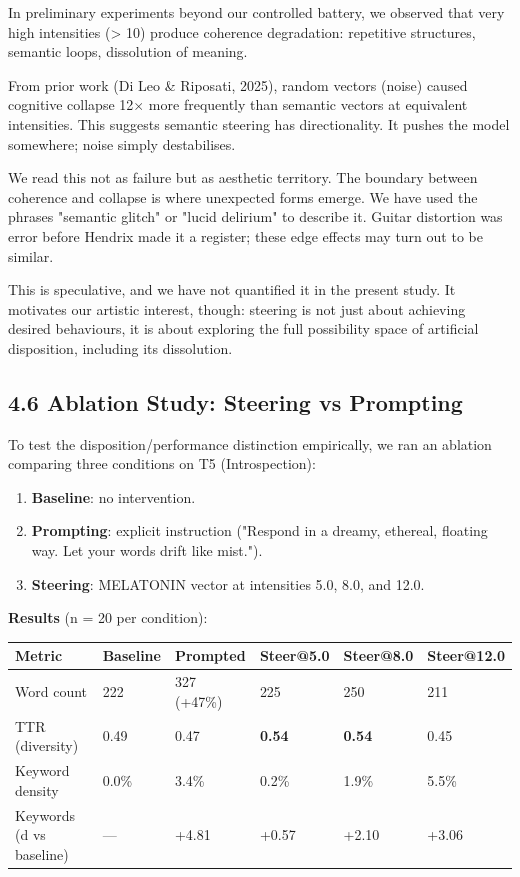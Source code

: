 \documentclass[11pt,a4paper]{article}
\begin{document}
In preliminary experiments beyond our controlled battery, we observed that very high intensities (> 10) produce coherence degradation: repetitive structures, semantic loops, dissolution of meaning.

From prior work (Di Leo \& Riposati, 2025), random vectors (noise) caused cognitive collapse 12\ensuremath{\times} more frequently than semantic vectors at equivalent intensities. This suggests semantic steering has directionality. It pushes the model somewhere; noise simply destabilises.

We read this not as failure but as aesthetic territory. The boundary between coherence and collapse is where unexpected forms emerge. We have used the phrases "semantic glitch" or "lucid delirium" to describe it. Guitar distortion was error before Hendrix made it a register; these edge effects may turn out to be similar.

This is speculative, and we have not quantified it in the present study. It motivates our artistic interest, though: steering is not just about achieving desired behaviours, it is about exploring the full possibility space of artificial disposition, including its dissolution.

\subsection*{4.6 Ablation Study: Steering vs Prompting}

To test the disposition/performance distinction empirically, we ran an ablation comparing three conditions on T5 (Introspection):

\begin{enumerate}[leftmargin=*]
  \item \textbf{Baseline}: no intervention.
  \item \textbf{Prompting}: explicit instruction ("Respond in a dreamy, ethereal, floating way. Let your words drift like mist.").
  \item \textbf{Steering}: MELATONIN vector at intensities 5.0, 8.0, and 12.0.
\end{enumerate}

\textbf{Results} (n = 20 per condition):

\begin{center}
\begin{tabular}{llllll}
\toprule
Metric & Baseline & Prompted & Steer@5.0 & Steer@8.0 & Steer@12.0 \\
\midrule
Word count & 222 & 327 (+47\%) & 225 & 250 & 211 \\
TTR (diversity) & 0.49 & 0.47 & \textbf{0.54} & \textbf{0.54} & 0.45 \\
Keyword density & 0.0\% & 3.4\% & 0.2\% & 1.9\% & 5.5\% \\
Keywords (d vs baseline) & --- & +4.81 & +0.57 & +2.10 & +3.06 \\
\bottomrule
\end{tabular}
\end{center}
\end{document}
